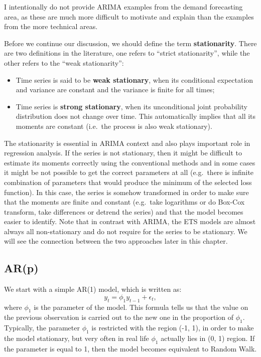 \documentclass[
]{book}
\providecommand{\tightlist}{%
  \setlength{\itemsep}{0pt}\setlength{\parskip}{0pt}}
\theoremstyle{definition}
\theoremstyle{definition}
\theoremstyle{definition}
\theoremstyle{definition}
\theoremstyle{remark}
\begin{document}
I intentionally do not provide ARIMA examples from the demand forecasting area, as these are much more difficult to motivate and explain than the examples from the more technical areas.

Before we continue our discussion, we should define the term \textbf{stationarity}. There are two definitions in the literature, one refers to ``strict stationarity'', while the other refers to the ``weak stationarity'':

\begin{itemize}
\tightlist
\item
  Time series is said to be \textbf{weak stationary}, when its conditional expectation and variance are constant and the variance is finite for all times;
\item
  Time series is \textbf{strong stationary}, when its unconditional joint probability distribution does not change over time. This automatically implies that all its moments are constant (i.e.~the process is also weak stationary).
\end{itemize}

The stationarity is essential in ARIMA context and also plays important role in regression analysis. If the series is not stationary, then it might be difficult to estimate its moments correctly using the conventional methods and in some cases it might be not possible to get the correct parameters at all (e.g.~there is infinite combination of parameters that would produce the minimum of the selected loss function). In this case, the series is somehow transformed in order to make sure that the moments are finite and constant (e.g.~take logarithms or do Box-Cox transform, take differences or detrend the series) and that the model becomes easier to identify. Note that in contrast with ARIMA, the ETS models are almost always all non-stationary and do not require for the series to be stationary. We will see the connection between the two approaches later in this chapter.

\hypertarget{AR}{%
\subsection{AR(p)}\label{AR}}

We start with a simple AR(1) model, which is written as:
\begin{equation}
  {y}_{t} = \phi_1 y_{t-1} + \epsilon_t ,
  \label{eq:ARIMA100Example}
\end{equation}
where \(\phi_1\) is the parameter of the model. This formula tells us that the value on the previous observation is carried out to the new one in the proportion of \(\phi_1\). Typically, the parameter \(\phi_1\) is restricted with the region (-1, 1), in order to make the model stationary, but very often in real life \(\phi_1\) actually lies in (0, 1) region. If the parameter is equal to 1, then the model becomes equivalent to Random Walk.
\end{document}
